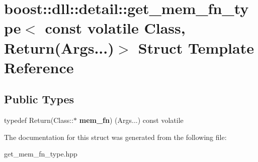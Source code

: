 \hypertarget{a00134}{}\section{boost\+:\+:dll\+:\+:detail\+:\+:get\+\_\+mem\+\_\+fn\+\_\+type$<$ const volatile Class, Return(Args...)$>$ Struct Template Reference}
\label{a00134}
\subsection*{Public Types}
\begin{DoxyCompactItemize}
\item 
typedef Return(Class\+::$\ast$ {\bfseries mem\+\_\+fn}) (Args...) const  volatile\hypertarget{a00134_a1652a1d1af8304e51754f398c2937122}{}\label{a00134_a1652a1d1af8304e51754f398c2937122}

\end{DoxyCompactItemize}


The documentation for this struct was generated from the following file\+:\begin{DoxyCompactItemize}
\item 
get\+\_\+mem\+\_\+fn\+\_\+type.\+hpp\end{DoxyCompactItemize}
